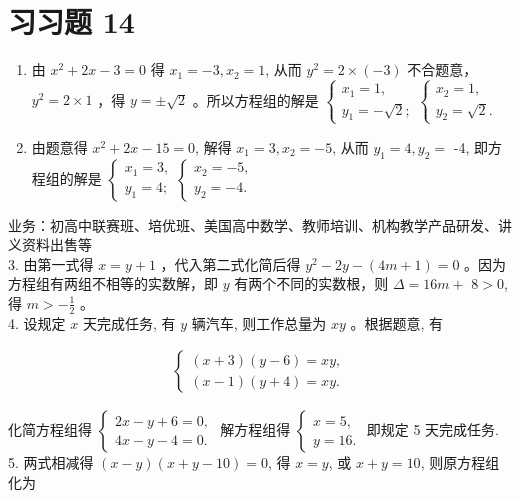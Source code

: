 \documentclass[10pt]{article}
\begin{document}
\section*{习习题 14}
\begin{enumerate}
  \item 由 $x^{2}+2 x-3=0$ 得 $x_{1}=-3, x_{2}=1$, 从而 $y^{2}=2 \times(-3)$ 不合题意， $y^{2}=2 \times 1$ ，得 $y= \pm \sqrt{2}$ 。所以方程组的解是 $\left\{\begin{array}{l}x_{1}=1, \\ y_{1}=-\sqrt{2} ;\end{array}\left\{\begin{array}{l}x_{2}=1, \\ y_{2}=\sqrt{2} .\end{array}\right.\right.$
  \item 由题意得 $x^{2}+2 x-15=0$, 解得 $x_{1}=3, x_{2}=-5$, 从而 $y_{1}=4, y_{2}=$ -4, 即方程组的解是 $\left\{\begin{array}{l}x_{1}=3, \\ y_{1}=4 ;\end{array}\left\{\begin{array}{l}x_{2}=-5, \\ y_{2}=-4 .\end{array}\right.\right.$
\end{enumerate}

业务：初高中联赛班、培优班、美国高中数学、教师培训、机构教学产品研发、讲义资料出售等\\
3. 由第一式得 $x=y+1$ ，代入第二式化简后得 $y^{2}-2 y-(4 m+1)=0$ 。因为方程组有两组不相等的实数解，即 $y$ 有两个不同的实数根，则 $\Delta=16 m+$ $8>0$, 得 $m>-\frac{1}{2}$ 。\\
4. 设规定 $x$ 天完成任务, 有 $y$ 辆汽车, 则工作总量为 $x y$ 。根据题意, 有

\begin{align*}
\left\{\begin{array}{l}
(x+3)(y-6)=x y, \\
(x-1)(y+4)=x y .
\end{array}\right.
\end{align*}

化简方程组得 $\left\{\begin{array}{l}2 x-y+6=0, \\ 4 x-y-4=0 .\end{array}\right.$ 解方程组得 $\left\{\begin{array}{l}x=5, \\ y=16 .\end{array}\right.$ 即规定 5 天完成任务.\\
5. 两式相减得 $(x-y)(x+y-10)=0$, 得 $x=y$, 或 $x+y=10$, 则原方程组化为
\end{document}
